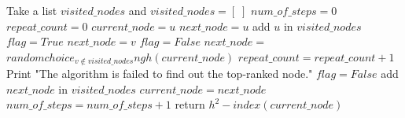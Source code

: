 \documentclass[conference]{IEEEtran}
\begin{document}
\begin{algorithm}
\caption{$IndexBasedHillClimbing(G,u,k,maxindex)$}
\label{algo2}
\begin{algorithmic}
\STATE Take a list $visited\_nodes$ and $visited\_nodes = [\;]$
\STATE $num\_of\_steps=0$
\STATE $repeat\_count=0$
\STATE $current\_node=u$
\STATE $next\_node=u$
\STATE add $u$ in $visited\_nodes$
\STATE $flag=True$
\STATE $next\_node=v$
\ENDIF
\ENDFOR
{}
\STATE $flag=False$
\STATE $next\_node=$
\STATE $randomchoice_{v \notin visited\_nodes}ngh(current\_node)$
\STATE $repeat\_count=repeat\_count+1$
\ELSE
\STATE Print "The algorithm is failed to find out the top-ranked node."
\STATE $flag=False$
\ENDIF
\ENDIF
{}
\STATE add $next\_node$ in $visited\_nodes$	
\STATE $current\_node=next\_node$
\STATE $num\_of\_steps=num\_of\_steps+1$
\ENDIF
\ENDWHILE
\STATE return $h^2-index(current\_node)$
\end{algorithmic}
\end{algorithm}

\end{document}
